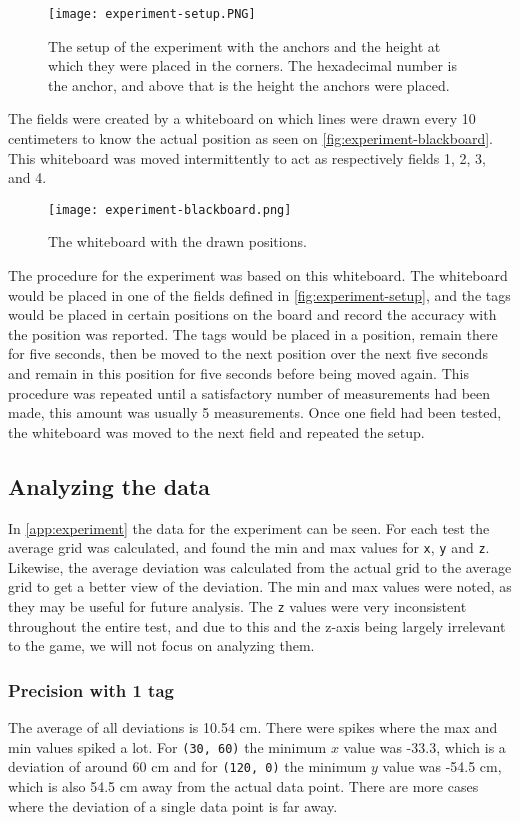 \begin{figure}[H]
    \centering
    \texttt{[image: experiment-setup.PNG]}
    \caption{The setup of the experiment with the anchors and the height at which they were placed in the corners. The hexadecimal number is the anchor, and above that is the height the anchors were placed.}
    \label{fig:experiment-setup}
\end{figure}
\noindent
The fields were created by a whiteboard on which lines were drawn every 10 centimeters to know the actual position as seen on \autoref{fig:experiment-blackboard}.
This whiteboard was moved intermittently to act as respectively fields 1, 2, 3, and 4.

\begin{figure}[H]
    \centering
    \texttt{[image: experiment-blackboard.png]}
    \caption{The whiteboard with the drawn positions.}
    \label{fig:experiment-blackboard}
\end{figure}
\noindent
The procedure for the experiment was based on this whiteboard.
The whiteboard would be placed in one of the fields defined in \autoref{fig:experiment-setup}, and the tags would be placed in certain positions on the board and record the accuracy with the position was reported.
The tags would be placed in a position, remain there for five seconds, then be moved to the next position over the next five seconds and remain in this position for five seconds before being moved again.
This procedure was repeated until a satisfactory number of measurements had been made, this amount was usually 5 measurements.
Once one field had been tested, the whiteboard was moved to the next field and repeated the setup.

\subsection{Analyzing the data}
In \autoref{app:experiment} the data for the experiment can be seen.
For each test the average grid was calculated, and found the min and max values for \texttt{x}, \texttt{y} and \texttt{z}.
Likewise, the average deviation was calculated from the actual grid to the average grid to get a better view of the deviation.
The min and max values were noted, as they may be useful for future analysis.
The \texttt{z} values were very inconsistent throughout the entire test, and due to this and the z-axis being largely irrelevant to the game, we will not focus on analyzing them.

\subsubsection{Precision with 1 tag} 
The average of all deviations is 10.54 cm.
There were spikes where the max and min values spiked a lot.
For \texttt{(30, 60)} the minimum $x$ value was -33.3, which is a deviation of around 60 cm and for \texttt{(120, 0)} the minimum $y$ value was -54.5 cm, which is also 54.5 cm away from the actual data point.
There are more cases where the deviation of a single data point is far away. 


